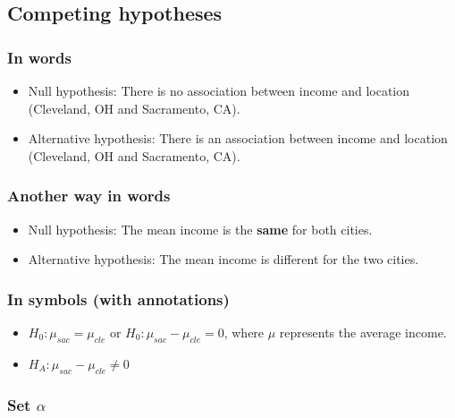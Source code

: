\documentclass[12pt,]{krantz}
\providecommand{\tightlist}{%
  \setlength{\itemsep}{0pt}\setlength{\parskip}{0pt}}
\theoremstyle{definition}
\theoremstyle{definition}
\theoremstyle{definition}
\theoremstyle{remark}
\begin{document}
\subsection{Competing hypotheses}\label{competing-hypotheses-3}

\subsubsection*{In words}\label{in-words-3}


\begin{itemize}
\item
  Null hypothesis: There is no association between income and location
  (Cleveland, OH and Sacramento, CA).
\item
  Alternative hypothesis: There is an association between income and
  location (Cleveland, OH and Sacramento, CA).
\end{itemize}

\subsubsection*{Another way in words}\label{another-way-in-words-1}


\begin{itemize}
\item
  Null hypothesis: The mean income is the \textbf{same} for both cities.
\item
  Alternative hypothesis: The mean income is different for the two
  cities.
\end{itemize}

\subsubsection*{In symbols (with
annotations)}\label{in-symbols-with-annotations-3}


\begin{itemize}
\tightlist
\item
  \(H_0: \mu_{sac} = \mu_{cle}\) or \(H_0: \mu_{sac} - \mu_{cle} = 0\),
  where \(\mu\) represents the average income.
\item
  \(H_A: \mu_{sac} - \mu_{cle} \ne 0\)
\end{itemize}

\subsubsection*{\texorpdfstring{Set
\(\alpha\)}{Set \textbackslash{}alpha}}\label{set-alpha-3}
\end{document}
